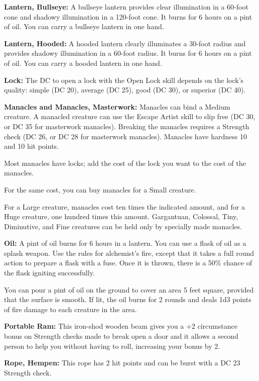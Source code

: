 \textbf{Lantern, Bullseye:} A bullseye lantern provides clear illumination in a 
60-foot cone and shadowy illumination in a 120-foot cone. It burns for 6 hours 
on a pint of oil. You can carry a bullseye lantern in one hand.

\textbf{Lantern, Hooded:} A hooded lantern clearly illuminates a 30-foot radius 
and provides shadowy illumination in a 60-foot radius. It burns for 6 hours on 
a pint of oil. You can carry a hooded lantern in one hand.

\textbf{Lock:} The DC to open a lock with the Open Lock skill depends on the lock's 
quality: simple (DC 20), average (DC 25), good (DC 30), or superior (DC 40).

\textbf{Manacles and Manacles, Masterwork:} Manacles can bind a Medium creature. 
A manacled creature can use the Escape Artist skill to slip free (DC 30, or DC 
35 for masterwork manacles). Breaking the manacles requires a Strength check (DC 
26, or DC 28 for masterwork manacles). Manacles have hardness 10 and 10 hit points.

Most manacles have locks; add the cost of the lock you want to the cost of the 
manacles.

For the same cost, you can buy manacles for a Small creature.

For a Large creature, manacles cost ten times the indicated amount, and for a Huge 
creature, one hundred times this amount. Gargantuan, Colossal, Tiny, Diminutive, 
and Fine creatures can be held only by specially made manacles.

\textbf{Oil:} A pint of oil burns for 6 hours in a lantern. You can use a flask 
of oil as a splash weapon. Use the rules for alchemist's fire, except that it takes 
a full round action to prepare a flask with a fuse. Once it is thrown, there is 
a 50\% chance of the flask igniting successfully.

You can pour a pint of oil on the ground to cover an area 5 feet square, provided 
that the surface is smooth. If lit, the oil burns for 2 rounds and deals 1d3 points 
of fire damage to each creature in the area.

\textbf{Portable Ram:} This iron-shod wooden beam gives you a +2 circumstance 
bonus on Strength checks made to break open a door and it allows a second person 
to help you without having to roll, increasing your bonus by 2.

\textbf{Rope, Hempen:} This rope has 2 hit points and can be burst with a DC 23 
Strength check.

